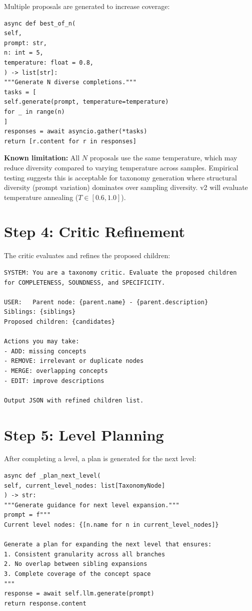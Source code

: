 \documentclass[12pt,a4paper,twoside]{report}
\begin{document}
Multiple proposals are generated to increase coverage:

\begin{lstlisting}[language=jsonx,caption={Best-of-N sampling}]
async def best_of_n(
self,
prompt: str,
n: int = 5,
temperature: float = 0.8,
) -> list[str]:
"""Generate N diverse completions."""
tasks = [
self.generate(prompt, temperature=temperature)
for _ in range(n)
]
responses = await asyncio.gather(*tasks)
return [r.content for r in responses]
\end{lstlisting}

\textbf{Known limitation:} All $N$ proposals use the same temperature, which may reduce
diversity compared to varying temperature across samples. Empirical testing suggests
this is acceptable for taxonomy generation where structural diversity (prompt variation)
dominates over sampling diversity. v2 will evaluate temperature annealing ($T \in [0.6, 1.0]$).

\section{Step 4: Critic Refinement}

The critic evaluates and refines the proposed children:

\begin{lstlisting}[language=jsonx,caption={Critic refinement prompt}]
SYSTEM: You are a taxonomy critic. Evaluate the proposed children
for COMPLETENESS, SOUNDNESS, and SPECIFICITY.

USER:   Parent node: {parent.name} - {parent.description}
Siblings: {siblings}
Proposed children: {candidates}

Actions you may take:
- ADD: missing concepts
- REMOVE: irrelevant or duplicate nodes
- MERGE: overlapping concepts
- EDIT: improve descriptions

Output JSON with refined children list.
\end{lstlisting}

\section{Step 5: Level Planning}

After completing a level, a plan is generated for the next level:

\begin{lstlisting}[language=jsonx,caption={Level planning}]
async def _plan_next_level(
self, current_level_nodes: list[TaxonomyNode]
) -> str:
"""Generate guidance for next level expansion."""
prompt = f"""
Current level nodes: {[n.name for n in current_level_nodes]}

Generate a plan for expanding the next level that ensures:
1. Consistent granularity across all branches
2. No overlap between sibling expansions
3. Complete coverage of the concept space
"""
response = await self.llm.generate(prompt)
return response.content
\end{lstlisting}
\end{document}

